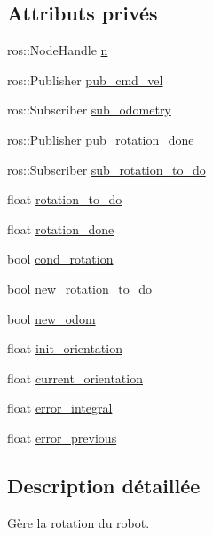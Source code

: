 \subsection*{Attributs privés}
\begin{DoxyCompactItemize}
\item 
ros\+::\+Node\+Handle \hyperlink{classrotation__action_a116971b35f73ec6dcb7ca53be6bbf459}{n}
\item 
ros\+::\+Publisher \hyperlink{classrotation__action_a15e1e82d0cd1cbfb2080f567eb638cd7}{pub\+\_\+cmd\+\_\+vel}
\item 
ros\+::\+Subscriber \hyperlink{classrotation__action_a86ae333af7e86815629ff69e01d95322}{sub\+\_\+odometry}
\item 
ros\+::\+Publisher \hyperlink{classrotation__action_a82d1885ad30462c65d09b87396f81a5f}{pub\+\_\+rotation\+\_\+done}
\item 
ros\+::\+Subscriber \hyperlink{classrotation__action_a859728fbc860bab7d39ea5b31751300f}{sub\+\_\+rotation\+\_\+to\+\_\+do}
\item 
float \hyperlink{classrotation__action_a16ed43ef2421913d1ed7a663a973d70b}{rotation\+\_\+to\+\_\+do}
\item 
float \hyperlink{classrotation__action_a50ba64db1407af812c76311ab05e3512}{rotation\+\_\+done}
\item 
bool \hyperlink{classrotation__action_aef9c5870964a99497c26b756bc9d5b94}{cond\+\_\+rotation}
\item 
bool \hyperlink{classrotation__action_a6c0a078ebfc8c1679dca30f78c307dfb}{new\+\_\+rotation\+\_\+to\+\_\+do}
\item 
bool \hyperlink{classrotation__action_a1c23e033725b84f96b0dcd8669220e99}{new\+\_\+odom}
\item 
float \hyperlink{classrotation__action_a6e3e3cac7a7f2365d030ad704e04c5a6}{init\+\_\+orientation}
\item 
float \hyperlink{classrotation__action_a6fe4eb8e6d6bfbdb424c7d230567cb05}{current\+\_\+orientation}
\item 
float \hyperlink{classrotation__action_a058362ccfef2bc879166a0b1c2d1fe07}{error\+\_\+integral}
\item 
float \hyperlink{classrotation__action_aadce9a6acc78dc94cabadf60f6205977}{error\+\_\+previous}
\end{DoxyCompactItemize}


\subsection{Description détaillée}
Gère la rotation du robot. 

